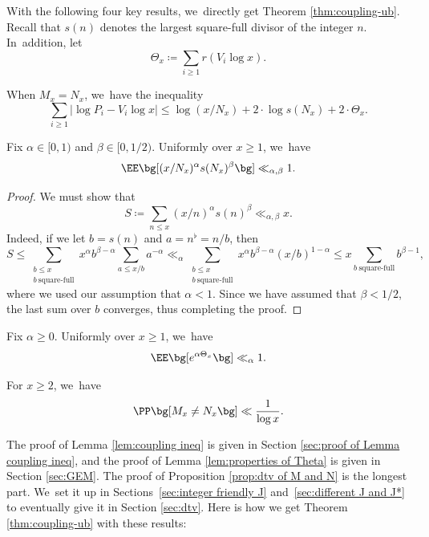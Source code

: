 With the following four key results, we~directly get Theorem \ref{thm:coupling-ub}. Recall that $s(n)$ denotes the largest square-full divisor of the integer $n$. In~addition, let
\begin{equation}
\label{eq:def of Theta_x}
\Theta_x \coloneqq \sum_{i \ge 1} r(V_i\log x).
\end{equation}

\begin{lem}
\label{lem:coupling ineq}
When $M_x = N_x$, we~have the inequality
\[
\sum_{i \ge 1} |{\log P_i - V_i\log x}| \le \log(x/N_x) + 2\cdot \log s(N_x) + 2\cdot \Theta_x.
\]
\end{lem}

\begin{lem}[Properties of $N_x$]
\label{lem:properties of N}
Fix $\alpha\in[0,1)$ and $\beta\in[0,1/2)$. Uniformly over $x\ge1$, we~have
\[
\EE\bg[(x/N_x)^\alpha s(N_x)^\beta\bg] \ll_{\alpha,\beta} 1.
\]
\end{lem}

\begin{proof} We must show that
\[
S\coloneqq \sum_{n \le x} (x/n)^\alpha s(n)^\beta\ll_{\alpha,\beta} x.
\]
Indeed, if we let $b=s(n)$ and $a=n^\flat=n/b$, then
\[
S\le \sum_{\substack{b\le x \\ b\ \text{square-full} }} x^\alpha b^{\beta-\alpha} \sum_{a\le x/b} a^{-\alpha}
\ll_\alpha \sum_{\substack{b\le x \\ b\ \text{square-full} }} x^\alpha b^{\beta-\alpha} (x/b)^{1-\alpha}
\le x \sum_{b\ \text{square-full} } b^{\beta-1},
\]
where we used our assumption that $\alpha<1$.
Since we have assumed that $\beta<1/2$, the last sum over $b$ converges, thus completing the proof.
\end{proof}

\begin{lem}
\label{lem:properties of Theta}
Fix $\alpha\ge 0$. Uniformly over $x\ge1$, we~have
\[
\EE\bg[e^{\alpha \Theta_x}\bg] \ll_{\alpha} 1.
\]
\end{lem}

\begin{prop}
\label{prop:dtv of M and N}
For $x \ge 2$, we~have
\[
\PP\bg[M_x \ne N_x\bg] \ll \frac{1}{\log x}.
\]
\end{prop}

The proof of Lemma \ref{lem:coupling ineq} is given in Section \ref{sec:proof of Lemma coupling ineq}, and the proof of Lemma \ref{lem:properties of Theta} is given in Section \ref{sec:GEM}. The proof of Proposition \ref{prop:dtv of M and N} is the longest part. We~set it up in Sections~\ref{sec:integer friendly J} and~\ref{sec:different J and J*} to eventually give it in Section \ref{sec:dtv}. Here is how we get Theorem \ref{thm:coupling-ub} with these results:

